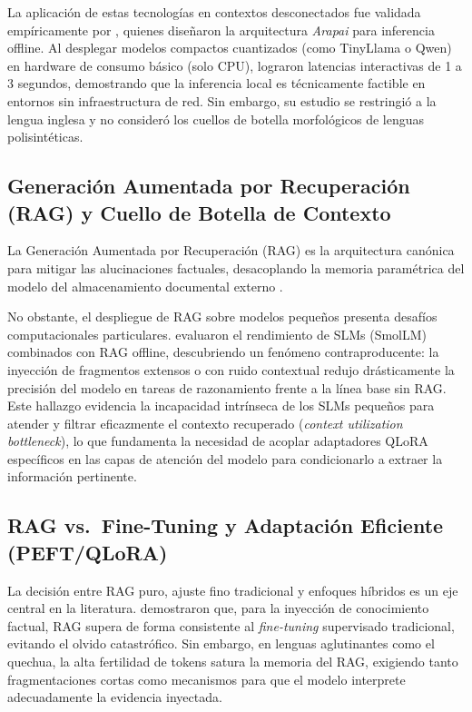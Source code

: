 La aplicación de estas tecnologías en contextos desconectados fue validada empíricamente por \citet{Walusimbi2026}, quienes diseñaron la arquitectura \textit{Arapai} para inferencia offline. Al desplegar modelos compactos cuantizados (como TinyLlama o Qwen) en hardware de consumo básico (solo CPU), lograron latencias interactivas de 1 a 3 segundos, demostrando que la inferencia local es técnicamente factible en entornos sin infraestructura de red. Sin embargo, su estudio se restringió a la lengua inglesa y no consideró los cuellos de botella morfológicos de lenguas polisintéticas.

\subsection{Generación Aumentada por Recuperación (RAG) y Cuello de Botella de Contexto}
La Generación Aumentada por Recuperación (RAG) es la arquitectura canónica para mitigar las alucinaciones factuales, desacoplando la memoria paramétrica del modelo del almacenamiento documental externo \citep{Li2025}. 

No obstante, el despliegue de RAG sobre modelos pequeños presenta desafíos computacionales particulares. \citet{Hevia2025} evaluaron el rendimiento de SLMs (SmolLM) combinados con RAG offline, descubriendo un fenómeno contraproducente: la inyección de fragmentos extensos o con ruido contextual redujo drásticamente la precisión del modelo en tareas de razonamiento frente a la línea base sin RAG. Este hallazgo evidencia la incapacidad intrínseca de los SLMs pequeños para atender y filtrar eficazmente el contexto recuperado (\textit{context utilization bottleneck}), lo que fundamenta la necesidad de acoplar adaptadores QLoRA específicos en las capas de atención del modelo para condicionarlo a extraer la información pertinente.

\subsection{RAG vs.\ Fine-Tuning y Adaptación Eficiente (PEFT/QLoRA)}
La decisión entre RAG puro, ajuste fino tradicional y enfoques híbridos es un eje central en la literatura. \citet{Ovadia2024} demostraron que, para la inyección de conocimiento factual, RAG supera de forma consistente al \textit{fine-tuning} supervisado tradicional, evitando el olvido catastrófico. Sin embargo, en lenguas aglutinantes como el quechua, la alta fertilidad de tokens satura la memoria del RAG, exigiendo tanto fragmentaciones cortas como mecanismos para que el modelo interprete adecuadamente la evidencia inyectada.

